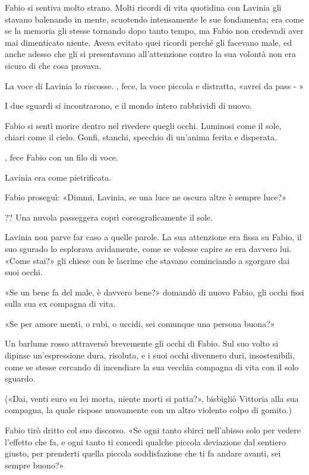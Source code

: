 Fabio si sentiva molto strano. Molti ricordi di vita quotidina con Lavinia gli stavano balenando in mente, scuotendo intensamente le sue fondamenta; era come se la memoria gli stesse tornando dopo tanto tempo, ma Fabio non credevadi aver mai dimenticato niente. Aveva evitato quei ricordi perché gli facevano male, ed anche adesso che gli si presentavano all'attenzione contro la sua volontà non era sicuro di che cosa provava.

La voce di Lavinia lo riscosse. , fece, la voce piccola e distratta, «avrei da pass - »

I due sguardi si incontrarono, e il mondo intero rabbrividì di nuovo.

Fabio si sentì morire dentro nel rivedere quegli occhi. Luminosi come il sole, chiari come il cielo. Gonfi, stanchi, specchio di un'anima ferita e disperata.

, fece Fabio con un filo di voce.

Lavinia era come pietrificata.

Fabio proseguì: «Dimmi, Lavinia, se una luce ne oscura altre è sempre luce?»

?? Una nuvola passeggera coprì coreograficamente il sole.

Lavinia non parve far caso a quelle parole. La sua attenzione era fissa su Fabio, il suo sgurado lo esplorava avidamente, come se volesse capire se era davvero lui. «Come stai?» gli chiese con
le lacrime che stavano cominciando a sgorgare dai suoi occhi. 

«Se un bene fa del male, è davvero bene?» domandò di nuovo Fabio, gli occhi fissi sulla sua ex compagna di vita.

«Se per amore menti, o rubi, o uccidi, sei comunque una persona buona?»

Un barlume rosso attraversò brevemente gli occhi di Fabio. Sul suo volto si dipinse un'espressione dura, risoluta, e i suoi occhi divennero duri, insostenibili, come se stesse cercando di incendiare la sua vecchia compagna di vita con il solo sguardo.

(«Dai, venti euro su lei morta, niente morti si patta?», bisbigliò Vittoria alla sua compagna, la quale rispose nuovamente con un altro violento colpo di gomito.)

Fabio tirò dritto col suo discorso. «Se ogni tanto sbirci nell'abisso solo per vedere l'effetto che fa, e ogni tanto ti concedi qualche piccola deviazione dal sentiero giusto, per prenderti quella piccola soddisfazione che ti fa andare avanti, sei sempre buono?»

